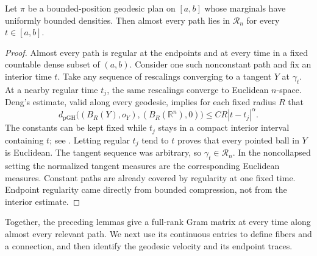 \begin{lemma}\label{frames:regular-paths}
 Let $\pi$ be a bounded-position geodesic plan on $[a,b]$ whose
 marginals have uniformly bounded densities.  Then almost every
 path lies in $\mathcal R_n$ for every $t\in[a,b]$.
\end{lemma}

\begin{proof}
 Almost every path is regular at the endpoints and at every time
 in a fixed countable dense subset of $(a,b)$.
 Consider one such nonconstant path and fix an interior time $t$.
 Take any sequence of rescalings converging to a tangent $Y$ at
 $\gamma_t$.  At a nearby regular time $t_j$, the same rescalings
 converge to Euclidean $n$-space.  Deng's estimate, valid along
 every geodesic, implies for each fixed radius $R$ that
 \[
  d_{\mathrm{pGH}}\bigl((B_R(Y),o_Y),
                   (B_R(\mathbb R^n),0)\bigr)
       \leq C R|t-t_j|^\alpha.
 \]
 The constants can be kept fixed while $t_j$ stays in a compact
 interior interval containing $t$; see
 \cite[Theorems~1.1--1.2]{Deng2020}.
 Letting regular $t_j$ tend to $t$ proves that every pointed ball
 in $Y$ is Euclidean.  The tangent sequence was arbitrary, so
 $\gamma_t\in\mathcal R_n$.  In the noncollapsed setting the
 normalized tangent measures are the corresponding Euclidean
 measures.  Constant paths are already covered by regularity at
 one fixed time.  Endpoint regularity came directly from bounded
 compression, not from the interior estimate.
\end{proof}

Together, the preceding lemmas give a full-rank Gram matrix at every
time along almost every relevant path.  We next use its continuous
entries to define fibers and a connection, and then identify the
geodesic velocity and its endpoint traces.


